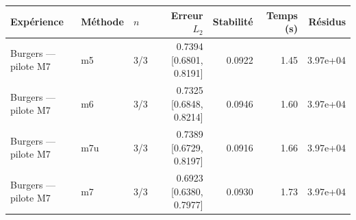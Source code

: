 \begin{tabular}{lllrrrr}
\toprule
Expérience & Méthode & $n$ & Erreur $L_2$ & Stabilité & Temps (s) & Résidus \\
\midrule
Burgers — pilote M7 & m5 & 3/3 & 0.7394 [0.6801, 0.8191] & 0.0922 & 1.45 & 3.97e+04 \\
Burgers — pilote M7 & m6 & 3/3 & 0.7325 [0.6848, 0.8214] & 0.0946 & 1.60 & 3.97e+04 \\
Burgers — pilote M7 & m7u & 3/3 & 0.7389 [0.6729, 0.8197] & 0.0916 & 1.66 & 3.97e+04 \\
Burgers — pilote M7 & m7 & 3/3 & 0.6923 [0.6380, 0.7977] & 0.0930 & 1.73 & 3.97e+04 \\
\bottomrule
\end{tabular}
